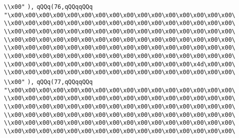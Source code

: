 \verb|\\x00"|\newline
\verb|),|\newline
\verb|qQQq(76,qQQqqQQq|\newline
\verb|"\x00\x00\x00\x00\x00\x00\x00\x00\x00\x00\x00\x00\x00\x00\x00\x00\|\newline
\verb|\\x00\x00\x00\x00\x00\x00\x00\x00\x00\x00\x00\x00\x00\x00\x00\x00\|\newline
\verb|\\x00\x00\x00\x00\x00\x00\x00\x00\x00\x00\x00\x00\x00\x00\x00\x00\|\newline
\verb|\\x00\x00\x00\x00\x00\x00\x00\x00\x00\x00\x00\x00\x00\x00\x00\x00\|\newline
\verb|\\x00\x00\x00\x00\x00\x00\x00\x00\x00\x00\x00\x00\x00\x00\x00\x00\|\newline
\verb|\\x00\x00\x00\x00\x00\x00\x00\x00\x00\x00\x00\x00\x00\x00\x00\x00\|\newline
\verb|\\x00\x00\x00\x00\x00\x00\x00\x00\x00\x00\x00\x00\x00\x4d\x00\x00\|\newline
\verb|\\x00\x00\x00\x00\x00\x00\x00\x00\x00\x00\x00\x00\x00\x00\x00\x00\|\newline
\verb|\\x00"|\newline
\verb|),|\newline
\verb|qQQq(77,qQQqqQQq|\newline
\verb|"\x00\x00\x00\x00\x00\x00\x00\x00\x00\x00\x00\x00\x00\x00\x00\x00\|\newline
\verb|\\x00\x00\x00\x00\x00\x00\x00\x00\x00\x00\x00\x00\x00\x00\x00\x00\|\newline
\verb|\\x00\x00\x00\x00\x00\x00\x00\x00\x00\x00\x00\x00\x00\x00\x00\x00\|\newline
\verb|\\x00\x00\x00\x00\x00\x00\x00\x00\x00\x00\x00\x00\x00\x00\x00\x00\|\newline
\verb|\\x00\x00\x00\x00\x00\x00\x00\x00\x00\x00\x00\x00\x00\x00\x00\x00\|\newline
\verb|\\x00\x00\x00\x00\x00\x00\x00\x00\x00\x00\x00\x00\x00\x00\x00\x00\|\newline
